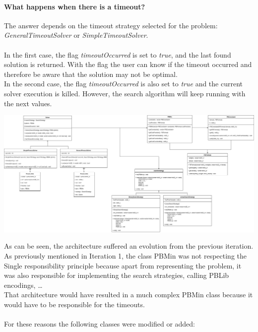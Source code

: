 \paragraph{What happens when there is a timeout?\\}
The answer depends on the timeout strategy selected for the problem: \emph{GeneralTimeoutSolver} or \emph{SimpleTimeoutSolver}. \\\\
In the first case, the flag \emph{timeoutOccurred} is set to \emph{true}, and the last found solution is returned. With the flag the user can know if the timeout occurred and therefore be aware that the solution may not be optimal.  \\
In the second case, the flag \emph{timeoutOccurred} is also set to \emph{true} and the current solver execution is killed. However, the search algorithm will keep running with the next values.  
\begin{center}
	\includegraphics[width=1.6\textwidth, angle=90]{Figures/Iteration_2_Architecture-UML.png}
	\label{it2arch}
\end{center}
\label{arch-error}
As can be seen, the architecture suffered an evolution from the previous iteration. As previously mentioned in Iteration 1, the class PBMin was not respecting the Single responsibility principle because apart from representing the problem, it was also responsible for implementing the search strategies, calling PBLib encodings, \ldots \\ 
That architecture would have resulted in a much complex PBMin class because it would have to be responsible for the timeouts.  \\\\
For these reasons the following classes were modified or added: 
